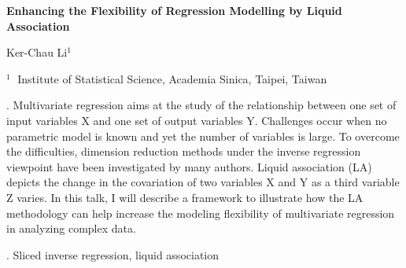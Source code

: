 \documentclass[12pt]{article}
\begin{document}
\begin{flushleft}


{\LARGE\bf Enhancing the Flexibility of Regression Modelling by Liquid Association}


\vspace{1.0cm}

Ker-Chau Li$^1$ 

\begin{description}

\item $^1 \;$ Institute of Statistical Science, Academia Sinica, Taipei, Taiwan


\end{description}

\end{flushleft}


\vspace{0.75cm}

. Multivariate regression aims at the study of the relationship between one set of input variables X and one set of output variables Y.  Challenges occur when no parametric model is known and yet the number of variables is large. To overcome the difficulties, dimension reduction methods   under the inverse regression viewpoint  have been investigated by many authors.  Liquid association (LA) depicts the change in the covariation of two variables X and Y as a third variable Z varies.  In this talk, I will describe a framework to illustrate how the LA methodology can help increase the modeling flexibility of multivariate regression in analyzing complex data. 


\vskip 2mm

.
Sliced inverse regression, liquid association
\end{document}
